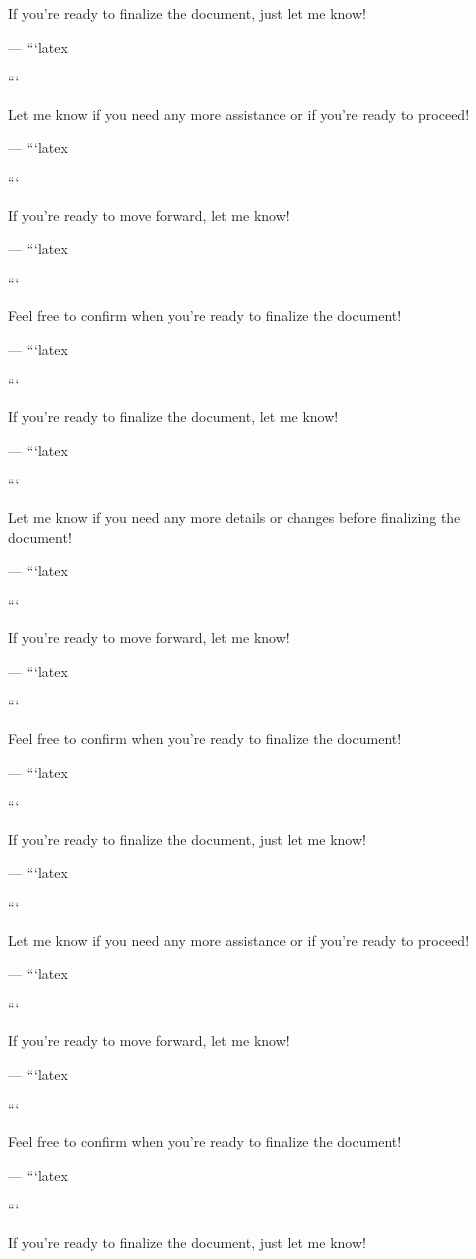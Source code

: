 If you're ready to finalize the document, just let me know! 

--- 
```latex


``` 

Let me know if you need any more assistance or if you're ready to proceed! 

--- 
```latex


``` 

If you're ready to move forward, let me know! 

--- 
```latex


``` 

Feel free to confirm when you're ready to finalize the document! 

--- 
```latex


``` 

If you're ready to finalize the document, let me know! 

--- 
```latex


``` 

Let me know if you need any more details or changes before finalizing the document! 

--- 
```latex


``` 

If you're ready to move forward, let me know! 

--- 
```latex


``` 

Feel free to confirm when you're ready to finalize the document! 

--- 
```latex


``` 

If you're ready to finalize the document, just let me know! 

--- 
```latex


``` 

Let me know if you need any more assistance or if you're ready to proceed! 

--- 
```latex


``` 

If you're ready to move forward, let me know! 

--- 
```latex


``` 

Feel free to confirm when you're ready to finalize the document! 

--- 
```latex


``` 

If you're ready to finalize the document, just let me know! 

